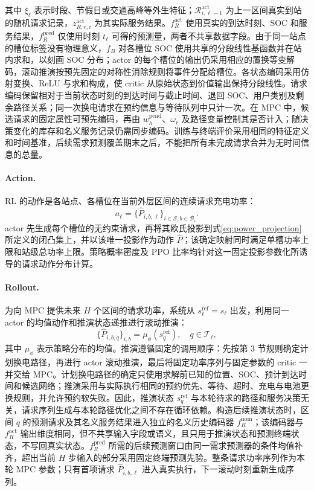 \documentclass[12pt,a4paper,UTF8]{ctexart}
\begin{document}
其中 $\xi_\ell$ 表示时段、节假日或交通高峰等外生特征；$\mathcal R_{i,\ell-1}^{\mathrm{act}}$ 为上一区间真实到站的随机请求记录，$z_{R,r,i}^{\mathrm{act}}$ 为其实际服务结果。$f_R^{\mathrm{act}}$ 使用真实的到达时刻、SOC 和服务结果，$f_R^{\mathrm{pred}}$ 仅使用时刻 $t_\ell$ 可得的预测量，两者不共享数据字段。由于同一站点的槽位标签没有物理意义，$f_B$ 对各槽位 SOC 使用共享的分段线性基函数并在站内求和，以刻画 SOC 分布；actor 的每个槽位的输出仍采用相应的置换等变解码，滚动推演按预先固定的对称性消除规则将事件分配给槽位。各状态编码采用仿射变换、ReLU 与求和构成，使 critic 从原始状态到价值输出保持分段线性。请求编码保留相对于当前状态时刻的到达时间与截止时间、退回 SOC、用户类别及剩余路径关系；同一次换电请求在预约信息与等待队列中只计一次。在 MPC 中，候选请求的固定属性可预先编码，再由 $w_h^{\mathrm{pend}}$、$\omega_r$ 及路径变量控制其是否计入；随决策变化的库存和名义服务记录仍需同步编码。训练与终端评价采用相同的特征定义和时间基准，后续需求预测覆盖期末之后，不能把所有未完成请求合并为无时间信息的总量。

\paragraph{Action.}
RL 的动作是各站点、各槽位在当前外层区间的连续请求充电功率：
\begin{equation}
a_\ell=
\{\widehat P_{i,b,\ell}\}_{i\in\mathcal S,b\in\mathcal B_i}.
\label{eq:rl_action}
\end{equation}
actor 先生成每个槽位的无约束请求，再将其欧氏投影到式\eqref{eq:power_projection}所定义的闭凸集上，并以该唯一投影作为动作 $\widehat P$；该确定映射同时满足单槽功率上限和站级总功率上限。策略概率密度及 PPO 比率均针对这一固定投影参数化所诱导的请求动作分布计算。

\paragraph{Rollout.}
为向 MPC 提供未来 $H$ 个区间的请求功率，系统从
$s_{\ell}^{\mathrm{ref}}=s_\ell$ 出发，利用同一 actor 的均值动作和推演状态递推进行滚动推演：
\begin{equation}
\{\widehat P_{i,b,q}\}_{i,b}
=
\mu_\phi(s_{q}^{\mathrm{ref}}),
\quad q\in\mathcal T_\ell,
\label{eq:rl_power_rollout}
\end{equation}
其中 $\mu_\phi$ 表示策略分布的均值。推演遵循固定的调用顺序：先按第 3 节规则确定计划换电路径，再进行 actor 滚动推演，最后将固定功率序列与固定参数的 critic 一并交给 MPC。计划换电路径的确定只使用求解前已知的位置、SOC、预计到达时间和候选网络；推演采用与实际执行相同的预约优先、等待、超时、充电与电池更换规则，并允许预约软失败。因此，推演状态 $s_q^{\mathrm{ref}}$ 与本轮待求的路径和服务决策无关，请求序列生成与本轮路径优化之间不存在循环依赖。构造后续推演状态时，区间 $q$ 的预测请求及其名义服务结果进入独立的名义历史编码器 $f_R^{\mathrm{nom}}$；该编码器与 $f_R^{\mathrm{act}}$ 输出维度相同，但不共享输入字段或语义，且只用于推演状态和预测终端状态，不写回真实状态。$f_R^{\mathrm{pred}}$ 所需的后续预测窗口由同一需求预测器的条件均值补齐，超出当前 $H$ 步输入的部分采用固定终端预测先验。整条请求功率序列作为本轮 MPC 参数；只有首项请求 $\widehat P_{i,b,\ell}$ 进入真实执行，下一滚动时刻重新生成序列。
\end{document}
